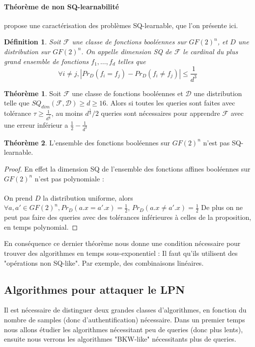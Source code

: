 \documentclass{article}		%
\newtheorem{defi}{Définition}
\theoremstyle{definition}
\newtheorem{theo}{Théorème}
\theoremstyle{plain}
\theoremstyle{plain}
\theoremstyle{plain}
\theoremstyle{plain}
\begin{document}
\paragraph{Théorème de non SQ-learnabilité}
\cite{Blum} propose une caractérisation des problèmes SQ-learnable, que
l'on présente ici.
\begin{defi}
Soit $\mathcal{F}$ une classe de fonctions booléennes sur $GF(2)^n$, et $D$ une
distribution sur $GF(2)^n$.
On appelle dimension SQ de $\mathcal{F}$ le cardinal
du plus grand ensemble de fonctions $f_1,\dots, f_d$ telles que 
$$\forall i \not= j, |Pr_D(f_i=f_j)-Pr_D(f_i \not= f_j)|\leq \frac{1}{d^3} $$
\end{defi}
\begin{theo}
Soit $\mathcal{F}$ une classe de fonctions booléennes et $\mathcal{D}$
une distribution telle que $SQ_{dim}(\mathcal{F}, \mathcal{D})\geq d \geq
16$. Alors si toutes les queries sont faites avec tolérance
$\tau\geq\frac{1}{d^{\frac{1}{3}}}$, au moins $d^{\frac{1}{3}}/2$ queries
sont nécessaires pour apprendre $\mathcal{F}$ avec une erreur inférieur a
$\frac{1}{2}-\frac{1}{d^3}$ 
\end{theo}
\begin{theo}
L'ensemble des fonctions booléennes sur $GF(2)^n$ n'est pas
SQ-learnable.
\end{theo}
\begin{proof}
En effet la dimension SQ de l'ensemble des fonctions affines booléennes sur
$GF(2)^n$ n'est pas polynomiale :
\\\\
On prend $D$ la distribution uniforme, alors 
$\forall a, a'\in GF(2)^n,
Pr_D(a.x=a'.x)=\frac{1}{2}$, $Pr_D(a.x\not=a'.x)=\frac{1}{2}$
 De plus on ne peut pas faire des queries avec
des tolérances inférieures à celles de la proposition, en temps
polynomial.
\end{proof}
En conséquence ce dernier théorème nous donne une condition nécessaire
pour trouver des algorithmes en temps sous-exponentiel : Il faut qu'ils
utilisent des "opérations non SQ-like". Par exemple, des combinaisons
linéaires.

\subsection{Algorithmes pour attaquer le LPN}
Il est nécessaire de distinguer deux grandes classes
d'algorithmes, en fonction du nombre de samples (donc d'authentification)
nécessaire. Dans un premier temps nous allons étudier les algorithmes
nécessitant peu de queries (donc plus lents), ensuite nous verrons
les algorithmes "BKW-like" nécessitants plus de queries.
\end{document}
